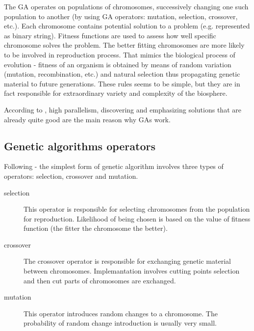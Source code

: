 \begin{}
The GA operates on populations of chromosomes, successively changing one such population to another (by using GA operators: mutation, selection, crossover, etc.). 
Each chromosome contains potential solution to a problem (e.g. represented as binary string). 
Fitness functions are used to assess how well specific chromosome solves the problem.
The better fitting chromosomes are more likely to be involved in reproduction process.
That mimics the biological process of evolution - fitness of an organism is obtained by means of random variation (mutation, recombination, etc.) and natural selection
thus propagating genetic material to future generations.
These rules seems to be simple, but they are in fact responsible for extraordinary variety and complexity of the biosphere.
\cite{Mitchell01} 
 
According to \cite{Mitchell01} , high parallelism, discovering and emphasizing solutions that are already quite good are the main reason why GAs work.  
 

\subsection{Genetic algorithms operators}

Following \cite{Mitchell01} - the simplest form of genetic algorithm involves three types of operators: selection, crossover and mutation. 

\begin{description}

\item[selection]
  This operator is responsible for selecting chromosomes from the population for reproduction.
  Likelihood of being chosen is based on the value of fitness function (the fitter the chromosome the better).
  
\item[crossover]
  The crossover operator is responsible for exchanging genetic material between chromosomes.
  Implemantation involves cutting points selection and then cut parts of chromosomes are exchanged.

\item[mutation]
  This operator introduces random changes to a chromosome.
  The probability of random change introduction is usually very small.  

\end{description}



\end{}
